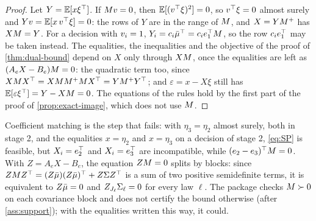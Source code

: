 \begin{proof}
Let $Y = \mathbb{E}[x\xi^\top]$.
If $M v = 0$, then $\mathbb{E}[(v^\top\xi)^2] = 0$, so $v^\top\xi = 0$ almost surely and $Yv = \mathbb{E}[x\,v^\top\xi] = 0$: the rows of $Y$ are in the range of $M$, and $X = YM^+$ has $XM = Y$.
For a decision with $v_i = 1$, $Y_i = c_i\bar\mu^\top = c_ie_1^\top M$, so the row $c_ie_1^\top$ may be taken instead.
The equalities, the inequalities and the objective of the proof of \cref{thm:dual-bound} depend on $X$ only through $XM$, once the equalities are left as $(A_eX - B_e)M = 0$:
the quadratic term too, since $XM X^\top = XMM^+M X^\top = YM^+Y^\top$;
and $\varepsilon = x - X\xi$ still has $\mathbb{E}[\varepsilon\xi^\top] = Y - XM = 0$.
The equations of the rules hold by the first part of the proof of \cref{prop:exact-image}, which does not use $M$.
\end{proof}

Coefficient matching is the step that fails: with $\eta_3 = \eta_2$ almost surely, both in stage 2, and the equalities $x = \eta_2$ and $x = \eta_3$ on a decision of stage 2,
\eqref{eq:SP} is feasible, but $X_i = e_2^\top$ and $X_i = e_3^\top$ are incompatible, while $(e_2 - e_3)^\top M = 0$.
With $Z = A_eX - B_e$, the equation $ZM = 0$ splits by blocks: since $ZM Z^\top = (Z\bar\mu)(Z\bar\mu)^\top + Z\Sigma Z^\top$ is a sum of two positive semidefinite terms,
it is equivalent to $Z\bar\mu = 0$ and $Z_{J_\ell}\Sigma_\ell = 0$ for every law $\ell$.
The package checks $M \succ 0$ on each covariance block and does not certify the bound otherwise (after \cref{ass:support});
with the equalities written this way, it could.
